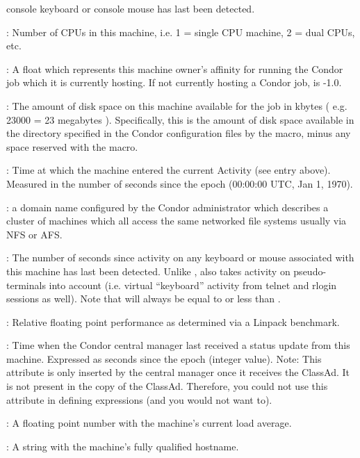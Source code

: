 \begin{description}
console keyboard or console mouse has last been detected.
%
\item[\AdAttr{Cpus}] : Number of CPUs in this machine, i.e. 1 = single CPU machine, 2 = dual
CPUs, etc.
%
\item[\AdAttr{CurrentRank}] : A float which represents this machine owner's affinity
for running the Condor job which it is currently hosting.  If not
currently hosting a Condor job,  is -1.0.
%
\item[\AdAttr{Disk}] : The amount of disk space on this machine available for
the job in kbytes ( e.g. 23000 = 23 megabytes ).  Specifically, this
is the amount of disk space available in the directory specified in
the Condor configuration files by the  macro, minus any
space reserved with the  macro.
%
\item[\AdAttr{EnteredCurrentActivity}] : Time at which the machine entered the 
current Activity (see  entry above).  Measured in the
number of seconds since the epoch (00:00:00 UTC, Jan 1, 1970).
%
\item[\AdAttr{FileSystemDomain}] : a domain name configured by the Condor 
administrator which describes a cluster of machines which all access 
the same networked file systems usually via NFS or AFS.  
%
\item[\AdAttr{KeyboardIdle}] : The number of seconds since activity on any
keyboard or mouse associated with this machine has last been detected.
Unlike ,  also takes activity 
on pseudo-terminals into
account (i.e. virtual ``keyboard'' activity from telnet and rlogin
sessions as well).  Note that  will always be equal to or
less than .
%
\item[\AdAttr{KFlops}] : Relative floating point performance as determined via a
Linpack benchmark.
%
\item[\AdAttr{LastHeardForm}] : Time when the Condor central manager last
received a status update from this machine.  
Expressed as seconds since the epoch (integer value).
Note: This attribute is only inserted by the central manager once it
receives the ClassAd.
It is not present in the  copy of the ClassAd.
Therefore, you could not use this attribute in defining 
expressions (and you would not want to).
%
\item[\AdAttr{LoadAvg}] : A floating point number with the machine's current load
average.
%
\item[\AdAttr{Machine}] : A string with the machine's fully qualified hostname.

\end{description}
